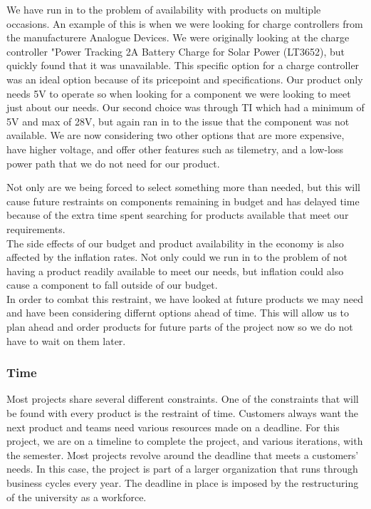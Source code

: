 We have run in to the problem of availability with products on multiple occasions. An example of this is when we were looking for charge controllers from the manufacturere Analogue Devices. We were originally looking at the charge controller "Power Tracking 2A Battery Charge for Solar Power (LT3652), but quickly found that it was unavailable. This specific option for a charge controller was an ideal option because of its pricepoint and specifications. Our product only needs 5V to operate so when looking for a component we were looking to meet just about our needs. Our second choice was through TI which had a minimum of 5V and max of 28V, but again ran in to the issue that the component was not available. We are now considering two other options that are more expensive, have higher voltage, and offer other features such as tilemetry, and a low-loss power path that we do not need for our product.

Not only are we being forced to select something more than needed, but this will cause future restraints on components remaining in budget and has delayed time because of the extra time spent searching for products available that meet our requirements.\\

The side effects of our budget and product availability in the economy is also affected by the inflation rates. Not only could we run in to the problem of not having a product readily available to meet our needs, but inflation could also cause a component to fall outside of our budget. \\

In order to combat this restraint, we have looked at future products we may need and have been considering differnt options ahead of time. This will allow us to plan ahead and order products for future parts of the project now so we do not have to wait on them later. \\
\subsubsection{Time}
Most projects share several different constraints. One of the constraints that will be found with every product is the restraint of time. Customers always want the next product and teams need various resources made on a deadline. For this project, we are on a timeline to complete the project, and various iterations, with the semester. Most projects revolve around the deadline that meets a customers' needs. In this case, the project is part of a larger organization that runs through business cycles every year. The deadline in place is imposed by the restructuring of the university as a workforce.\\

